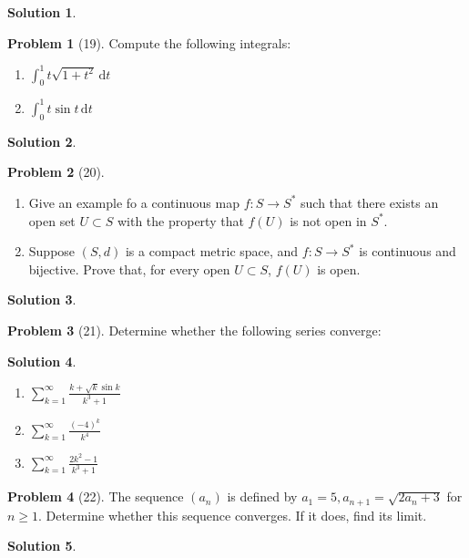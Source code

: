 \documentclass[12pt]{article}
\theoremstyle{definition} %
\newtheorem{solution}{Solution}
\newtheorem{problem}{Problem}
\theoremstyle{plain} %
\begin{document}
\begin{solution}
    
\end{solution}
\begin{problem}[19]
   Compute the following integrals:
   \begin{enumerate}
    \item $\int_{0}^{1} t\sqrt{1+t^{2}}  \,\mathrm{d}t $
    \item $\int_{0}^{1} t \sin t \,\mathrm{d}t $  
   \end{enumerate} 
\end{problem}
\begin{solution}
    
\end{solution}
\begin{problem}[20]
   \begin{enumerate}
    \item Give an example fo a continuous map $f: S\to S^{*}$ such that there exists an open set $U \subset S$ with the property that $f(U)$ is not open in $S^{*}$.
    \item Suppose $(S,d)$ is a compact metric space, and $f:S\to S^{*}$ is continuous and bijective. Prove that, for every open $U \subset S$, $f(U)$ is open.       
   \end{enumerate} 
\end{problem}
\begin{solution}
    
\end{solution}
\begin{problem}[21]
   Determine whether the following series converge: 
\end{problem}
\begin{solution}
   \begin{enumerate}
    \item $\sum_{k=1}^{\infty} \frac{k+\sqrt{k} \sin k}{k^{3}+1}$
    \item $\sum_{k=1}^{\infty} \frac{(-4)^{k}}{k^{4}}$
    \item $\sum_{k=1}^{\infty} \frac{2k^{2}-1}{k^{3}+1}$   
   \end{enumerate} 
\end{solution}
\begin{problem}[22]
   The sequence $(a_{n})$ is defined by $a_1=5, a_{n+1}=\sqrt{2a_{n}+3} $ for $n\geq 1$. Determine whether this sequence converges. If it does, find its limit.    
\end{problem}
\begin{solution}
    
\end{solution}
\end{document}
